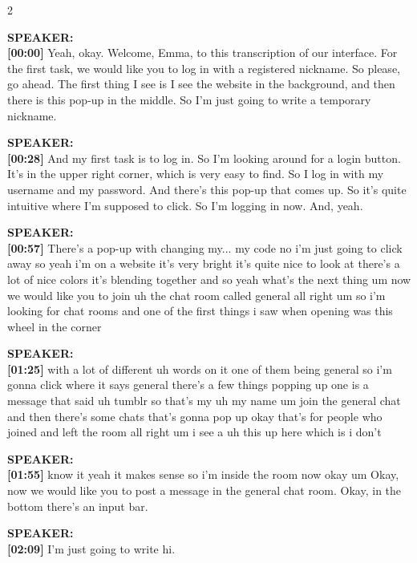{\scriptsize
\begin{multicols}{2}

\textbf{SPEAKER:}\\
\textbf{[00:00]} Yeah, okay. Welcome, Emma, to this transcription of our interface. For the first task, we would like you to log in with a registered nickname. So please, go ahead. The first thing I see is I see the website in the background, and then there is this pop-up in the middle. So I'm just going to write a temporary nickname.

\vspace{0.3cm}
\textbf{SPEAKER:}\\
\textbf{[00:28]} And my first task is to log in. So I'm looking around for a login button. It's in the upper right corner, which is very easy to find. So I log in with my username and my password. And there's this pop-up that comes up. So it's quite intuitive where I'm supposed to click. So I'm logging in now. And, yeah.

\vspace{0.3cm}
\textbf{SPEAKER:}\\
\textbf{[00:57]} There's a pop-up with changing my... my code no i'm just going to click away so yeah i'm on a website it's very bright it's quite nice to look at there's a lot of nice colors it's blending together and so yeah what's the next thing um now we would like you to join uh the chat room called general all right um so i'm looking for chat rooms and one of the first things i saw when opening was this wheel in the corner

\vspace{0.3cm}
\textbf{SPEAKER:}\\
\textbf{[01:25]} with a lot of different uh words on it one of them being general so i'm gonna click where it says general there's a few things popping up one is a message that said uh tumblr so that's my uh my name um join the general chat and then there's some chats that's gonna pop up okay that's for people who joined and left the room all right um i see a uh this up here which is i don't

\vspace{0.3cm}
\textbf{SPEAKER:}\\
\textbf{[01:55]} know it yeah it makes sense so i'm inside the room now okay um Okay, now we would like you to post a message in the general chat room. Okay, in the bottom there's an input bar.

\vspace{0.3cm}
\textbf{SPEAKER:}\\
\textbf{[02:09]} I'm just going to write hi.


\end{multicols}}
